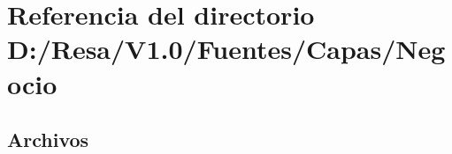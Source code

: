 \section{Referencia del directorio D\+:/\+Resa/\+V1.0/\+Fuentes/\+Capas/\+Negocio}
\label{dir_275db3723a6826ed60c2eea554e04aac}
\subsection*{Archivos}
\begin{DoxyCompactItemize}
\end{DoxyCompactItemize}
